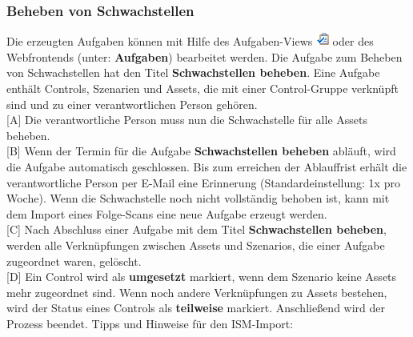 \documentclass[a4paper,10pt]{book}
\begin{document}
\subsubsection{Beheben von Schwachstellen}
Die erzeugten Aufgaben können mit Hilfe des Aufgaben-Views \includegraphics[height=2ex]{Icon/Tasks.png} oder des Webfrontends
(unter: \textbf{Aufgaben}) bearbeitet werden. Die Aufgabe zum Beheben von Schwachstellen hat den Titel \textbf{Schwachstellen beheben}. Eine Aufgabe enthält Controls, Szenarien und Assets, die mit einer Control-Gruppe verknüpft sind und zu einer verantwortlichen Person gehören.
\newline\\
{[}A{]} Die verantwortliche Person muss nun die Schwachstelle für alle Assets beheben.
\newline\\
{[}B{]} Wenn der Termin für die Aufgabe \textbf{Schwachstellen beheben} abläuft, wird die Aufgabe automatisch geschlossen. Bis zum erreichen der Ablauffrist
erhält die verantwortliche Person per E-Mail eine Erinnerung (Standardeinstellung: 1x pro Woche). Wenn die Schwachstelle noch nicht vollständig behoben ist, kann mit dem Import eines Folge-Scans eine neue Aufgabe erzeugt werden.
\newline\\
{[}C{]} Nach Abschluss einer Aufgabe mit dem Titel \textbf{Schwachstellen beheben}, werden alle Verknüpfungen zwischen
Assets und Szenarios, die einer Aufgabe zugeordnet waren, gelöscht.
\newline\\
{[}D{]} Ein Control wird als \textbf{umgesetzt} markiert, wenn dem Szenario keine Assets mehr zugeordnet sind. Wenn noch andere Verknüpfungen zu Assets bestehen, wird
der Status eines Controls als \textbf{teilweise} markiert. Anschließend wird der Prozess beendet.
Tipps und Hinweise für den ISM-Import:
\end{document}
